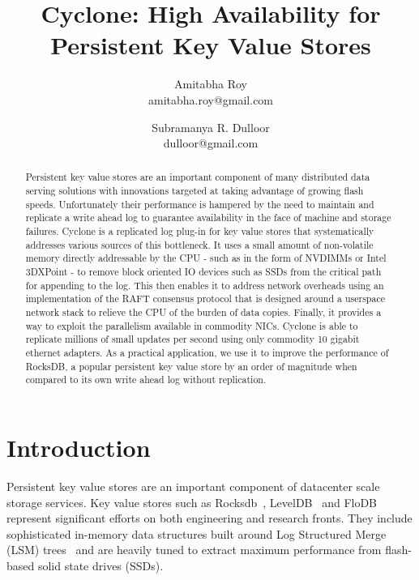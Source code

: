 \documentclass[letterpaper,twocolumn,10pt]{article}
\begin{document}
\title{Cyclone: High Availability for Persistent Key Value Stores}

\author{{\rm Amitabha Roy} \\ amitabha.roy@gmail.com 
	     \and {\rm Subramanya R. Dulloor} \\ dulloor@gmail.com}

\date{}
\maketitle


\begin{abstract}
\vspace{0.05in}
Persistent key value stores are an important component of many
distributed data serving solutions with innovations targeted at taking
advantage of growing flash speeds. Unfortunately their performance is
hampered by the need to maintain and replicate a write ahead log to
guarantee availability in the face of machine and storage
failures. Cyclone is a replicated log plug-in for key value stores
that systematically addresses various sources of this bottleneck. It
uses a small amount of non-volatile memory directly addressable by the
CPU - such as in the form of NVDIMMs or Intel 3DXPoint - to remove
block oriented IO devices such as SSDs from the critical path for
appending to the log. This then enables it to address network
overheads using an implementation of the RAFT consensus protocol that
is designed around a userspace network stack to relieve the CPU of the
burden of data copies.  Finally, it provides a way to exploit the
parallelism available in commodity NICs.  Cyclone is able to replicate
millions of small updates per second using only commodity 10 gigabit
ethernet adapters. As a practical application, we use it to improve
the performance of RocksDB, a popular persistent key value store by an
order of magnitude when compared to its own write ahead log without
replication.
\end{abstract}

\section{Introduction}
Persistent key value stores are an important component of datacenter
scale storage services. Key value stores such as
Rocksdb~\cite{rocksdb}, LevelDB~\cite{leveldb} and FloDB~\cite{flodb}
represent significant efforts on both engineering and research
fronts. They include sophisticated in-memory data structures built
around Log Structured Merge (LSM) trees~\cite{lsmtree} and are heavily
tuned to extract maximum performance from flash-based solid state
drives (SSDs).
\end{document}
